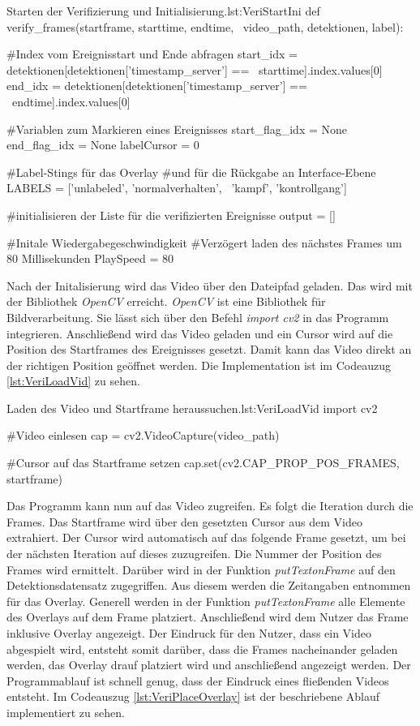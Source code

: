 \begin{pythoncode}{Starten der Verifizierung und Initialisierung.}{lst:VeriStartIni}
def verify_frames(startframe, starttime, endtime, \ 
        video_path, detektionen, label):
    
    #Index vom Ereignisstart und Ende abfragen
    start_idx = detektionen[detektionen['timestamp_server'] == \ 
        starttime].index.values[0]
    end_idx = detektionen[detektionen['timestamp_server'] == \ 
        endtime].index.values[0]
    
    #Variablen zum Markieren eines Ereignisses
    start_flag_idx = None
    end_flag_idx = None
    labelCursor = 0

    #Label-Stings für das Overlay 
    #und für die Rückgabe an Interface-Ebene
    LABELS = ['unlabeled', 'normalverhalten', \ 
              'kampf', 'kontrollgang']

    #initialisieren der Liste für die verifizierten Ereignisse
    output = []

    #Initale Wiedergabegeschwindigkeit
    #Verzögert laden des nächstes Frames um 80 Millisekunden 
    PlaySpeed = 80
\end{pythoncode}

Nach der Initalisierung wird das Video über den Dateipfad geladen. Das wird mit der Bibliothek \textit{OpenCV} erreicht. \textit{OpenCV} ist eine Bibliothek für Bildverarbeitung. Sie lässt sich über den Befehl \textit{import cv2} in das Programm integrieren. Anschließend wird das Video geladen und ein Cursor wird auf die Position des Startframes des Ereignisses gesetzt. Damit kann das Video direkt an der richtigen Position geöffnet werden. Die Implementation ist im Codeauzug \ref{lst:VeriLoadVid} zu sehen.

\begin{pythoncode}{Laden des Video und Startframe heraussuchen.}{lst:VeriLoadVid}
import cv2

#Video einlesen
cap = cv2.VideoCapture(video_path)

#Cursor auf das Startframe setzen
cap.set(cv2.CAP_PROP_POS_FRAMES, startframe)
\end{pythoncode}

Das Programm kann nun auf das Video zugreifen. Es folgt die Iteration durch die Frames. Das Startframe wird über den gesetzten Cursor aus dem Video extrahiert. Der Cursor wird automatisch auf das folgende Frame gesetzt, um bei der nächsten Iteration auf dieses zuzugreifen. Die Nummer der Position des Frames wird ermittelt. Darüber wird in der Funktion \textit{putTextonFrame} auf den Detektionsdatensatz zugegriffen. Aus diesem werden die Zeitangaben entnommen für das Overlay. Generell werden in der Funktion \textit{putTextonFrame} alle Elemente des Overlays auf dem Frame platziert. Anschließend wird dem Nutzer das Frame inklusive Overlay angezeigt. Der Eindruck für den Nutzer, dass ein Video abgespielt wird, entsteht somit darüber, dass die Frames nacheinander geladen werden, das Overlay drauf platziert wird und anschließend angezeigt werden. Der Programmablauf ist schnell genug, dass der Eindruck eines fließenden Videos entsteht. Im Codeauszug \ref{lst:VeriPlaceOverlay} ist der beschriebene Ablauf implementiert zu sehen.

